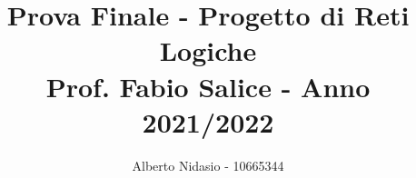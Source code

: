 \title{
    Prova Finale - Progetto di Reti Logiche \\
    \large Prof. Fabio Salice - Anno 2021/2022
}

\author{Alberto Nidasio - 10665344}
